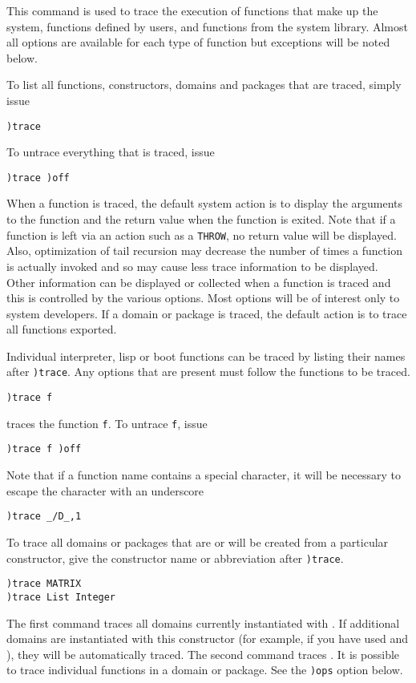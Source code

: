 {{{{{{{This command is used to trace the execution of functions that make
up the \Language{} system, functions defined by users,
and functions from the system library.
Almost all options are available for each type of function but
exceptions will be noted below.

To list all functions, constructors, domains and packages that are
traced, simply issue
\begin{verbatim}
)trace
\end{verbatim}
To untrace everything that is traced, issue
\begin{verbatim}
)trace )off
\end{verbatim}
When a function is traced, the default system action is to display
the arguments to the function and the return value when the
function is exited.
Note that if a function is left via an action such as a {\tt THROW}, no
return value will be displayed.
Also, optimization of tail recursion may decrease the number of
times a function is actually invoked and so may cause less trace
information to be displayed.
Other information can be displayed or collected when a function is
traced and this is controlled by the various options.
Most options will be of interest only to \Language{} system
developers.
If a domain or package is traced, the default action is to trace
all functions exported.

Individual interpreter, lisp or boot
functions can be traced by listing their names after
{\tt )trace}.
Any options that are present must follow the functions to be
traced.
\begin{verbatim}
)trace f
\end{verbatim}
traces the function {\tt f}.
To untrace {\tt f}, issue
\begin{verbatim}
)trace f )off
\end{verbatim}
Note that if a function name contains a special character, it will
be necessary to escape the character with an underscore
%
\begin{verbatim}
)trace _/D_,1
\end{verbatim}
%
To trace all domains or packages that are or will be created from a particular
constructor, give the constructor name or abbreviation after
{\tt )trace}.
%
\begin{verbatim}
)trace MATRIX
)trace List Integer
\end{verbatim}
%
The first command traces all domains currently instantiated with
.
If additional domains are instantiated with this constructor
(for example, if you have used  and
), they will be automatically traced.
The second command traces .
It is possible to trace individual functions in a domain or
package.
See the {\tt )ops} option below.

}}}}}}}
